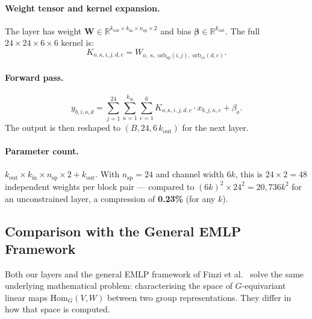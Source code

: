 \documentclass[11pt]{article}
\newcommand{\bW}{\mathbf{W}}
\newcommand{\orbsp}{\mathrm{orb}_{\mathrm{sp}}}
\newcommand{\orbco}{\mathrm{orb}_{\mathrm{co}}}
\newcommand{\R}{\mathbb{R}}
\begin{document}
\paragraph{Weight tensor and kernel expansion.}
The layer has weight
$\bW \in \R^{k_{\mathrm{out}} \times k_{\mathrm{in}} \times n_{\mathrm{sp}} \times 2}$
and bias $\boldsymbol{\beta} \in \R^{k_{\mathrm{out}}}$.
The full $24 \times 24 \times 6 \times 6$ kernel is:
\begin{equation}
  K_{o,\kappa,i,j,d,c} = W_{o,\; \kappa,\; \orbsp(i,j),\; \orbco(d,c)}.
  \label{eq:colorconv_kernel}
\end{equation}

\paragraph{Forward pass.}
\begin{equation}
  y_{b,i,o,d} = \sum_{j=1}^{24} \sum_{\kappa=1}^{k_{\mathrm{in}}}
                \sum_{c=1}^{6} K_{o,\kappa,i,j,d,c} \cdot x_{b,j,\kappa,c}
                + \beta_o.
  \label{eq:colorconv_forward}
\end{equation}
The output is then reshaped to $(B, 24, 6\,k_{\mathrm{out}})$ for the next layer.

\paragraph{Parameter count.}
$k_{\mathrm{out}} \times k_{\mathrm{in}} \times n_{\mathrm{sp}} \times 2
+ k_{\mathrm{out}}$.
With $n_{\mathrm{sp}} = 24$ and channel width $6k$, this is
$24 \times 2 = 48$ independent weights per block pair — compared to
$(6k)^2 \times 24^2 = 20{,}736 k^2$ for an unconstrained layer,
a compression of \textbf{0.23\%} (for any $k$).

\subsection{Comparison with the General EMLP Framework}
\label{sec:emlp_comparison}

Both our layers and the general EMLP framework of Finzi et al.\
\cite{finzi2021practical} solve the same underlying mathematical problem:
characterising the space of $G$-equivariant linear maps
$\text{Hom}_G(V, W)$ between two group representations.
They differ in how that space is computed.
\end{document}

